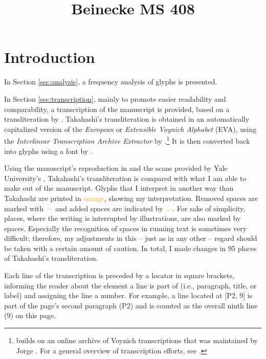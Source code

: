 \documentclass{scrarticle}
\title{Beinecke MS 408}
\date{}
\begin{document}
\maketitle


\section{Introduction}\label{sec:introduction}
In Section \ref{sec:analysis}, a frequency analysis of glyphs is presented.

In Section \ref{sec:transcription}, mainly to promote easier readability and comparability, a transcription of the manuscript is provided, based on a transliteration by \citet{takahashi_voynich_2004}.
Takahashi's transliteration is obtained in an automatically capitalized version of the \textit{European} or \textit{Extensible Voynich Alphabet} (EVA), using the \textit{Interlinear Transcription Archive Extractor} by \citet{schwerdtfeger_voynich_2004}.\footnote{\citet{schwerdtfeger_voynich_2004} builds on an online archive of Voynich transcriptions that was maintained by Jorge \citet{stolfi_voynich_1998}. For a general overview of transcription efforts, see \citet{zandbergen_text_2023}.}
It is then converted back into glyphs using a font by \citet{bettencourt_voynich_2019}.

Using the manuscript's reproduction in \citet{clemens_voynich_2016} and the scans provided by  Yale University's \citet{beinecke_voynich_2004}, Takahashi's transliteration is compared with what I am able to make out of the manuscript.
Glyphs that I interpret in another way than Takahashi are printed in \textcolor{orange}{orange}, showing my interpretation.
Removed spaces are marked with \textcolor{orange}{$\frown$} and added spaces are indicated by \textcolor{orange}{$\smile$}.
For sake of simplicity, places, where the writing is interrupted by illustrations, are also marked by spaces.
Especially the recognition of spaces in running text is sometimes very difficult; therefore, my adjustments in this -- just as in any other -- regard should be taken with a certain amount of caution.
In total, I made changes in 95 places of Takahashi's transliteration.

Each line of the transcription is preceded by a locator in square brackets, informing the reader about the element a line is part of (i.e., paragraph, title, or label) and assigning the line a number.
For example, a line located at [P2, 9] is part of the page's second paragraph (P2) and is counted as the overall ninth line (9) on this page.
\end{document}

